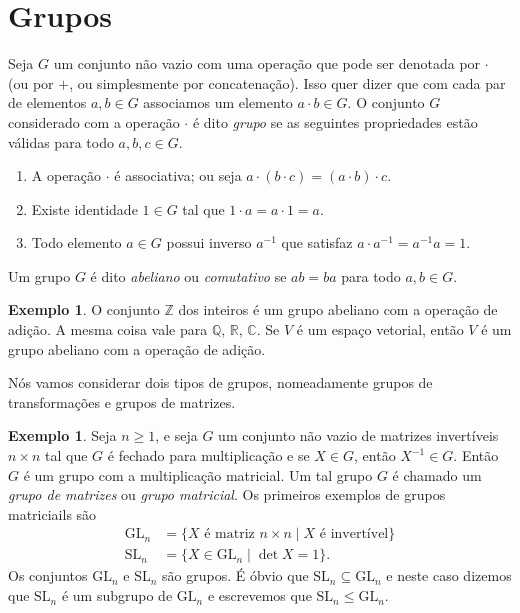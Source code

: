 \documentclass[12pt]{amsart}
\newcommand{\Q}{\mathbb Q}
\newcommand{\Z}{\mathbb Z}
\newcommand{\C}{\mathbb C}
\newcommand{\R}{\mathbb R}
\newcommand{\gl}[1]{\mbox{GL}_{#1}}
\newcommand{\SL}[1]{\mbox{SL}_{#1}}
\theoremstyle{definition}
\newtheorem{example}[theorem]{Exemplo}
\begin{document}
\section{Grupos}
Seja $G$ um conjunto não vazio com uma operação que pode ser denotada por $\cdot$ (ou por $+$, ou simplesmente 
por concatenação). Isso quer dizer que com cada par de elementos 
$a,b\in G$ associamos um elemento $a\cdot b\in G$. O conjunto $G$ considerado com a operação $\cdot$ é dito 
\emph{grupo} se as seguintes propriedades estão válidas para todo $a,b,c\in G$. 
\begin{enumerate}
    \item A operação $\cdot$ é associativa; ou seja $a\cdot(b\cdot c)=(a\cdot b)\cdot c$. 
    \item Existe identidade $1\in G$ tal que $1\cdot a=a\cdot 1=a$.
    \item Todo elemento $a\in G$ possui inverso $a^{-1}$ que satisfaz $a\cdot a^{-1}=a^{-1}a=1$. 
\end{enumerate} 
Um grupo $G$ é dito \emph{abeliano} ou \emph{comutativo} se $ab=ba$ para todo $a,b\in G$. 


\begin{example}
    O conjunto $\Z$ dos inteiros é um grupo abeliano com a operação de adição. 
    A mesma coisa vale para $\Q$, $\R$, $\C$. Se $V$ é um espaço vetorial, então $V$ é um grupo abeliano
    com a operação de adição. 
\end{example}

Nós vamos considerar dois tipos de grupos, nomeadamente grupos de transformações e grupos de matrizes.

\begin{example}
    Seja $n\geq 1$, e seja $G$ um conjunto não vazio de matrizes invertíveis $n\times n$ tal que $G$ é fechado para multiplicação e se $X\in
    G$, então     $X^{-1}\in G$. Então $G$ é um grupo com a multiplicação matricial. Um tal grupo $G$ é chamado um \emph{grupo de matrizes} ou \emph{grupo matricial}. 
    Os primeiros exemplos de grupos matriciails são
    \begin{align*}
        \gl n&=\{X\mbox{ é matriz $n\times n$}\mid X\mbox{ é invertível}\}\\
        \SL n&=\{X\in\gl n\mid \det X=1\}.
    \end{align*}
    Os conjuntos $\gl n$ e $\SL n$ são grupos. É óbvio que $\SL n\subseteq \gl n$ e neste caso dizemos que 
    $\SL n$ é um subgrupo de $\gl n$ e escrevemos que $\SL n\leq \gl n$. 
\end{example}
\end{document}
